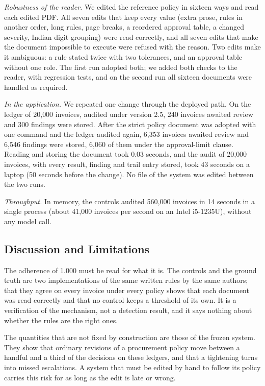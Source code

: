 \documentclass[conference]{IEEEtran}
\begin{document}
\textit{Robustness of the reader.} We edited the reference policy in sixteen ways and read each edited PDF. All seven edits that keep every value (extra prose, rules in another order, long rules, page breaks, a reordered approval table, a changed severity, Indian digit grouping) were read correctly, and all seven edits that make the document impossible to execute were refused with the reason. Two edits make it ambiguous: a rule stated twice with two tolerances, and an approval table without one role. The first run adopted both; we added both checks to the reader, with regression tests, and on the second run all sixteen documents were handled as required.

\textit{In the application.} We repeated one change through the deployed path. On the ledger of 20{,}000 invoices, audited under version 2.5, 240 invoices awaited review and 300 findings were stored. After the strict policy document was adopted with one command and the ledger audited again, 6{,}353 invoices awaited review and 6{,}546 findings were stored, 6{,}060 of them under the approval-limit clause. Reading and storing the document took 0.03 seconds, and the audit of 20{,}000 invoices, with every result, finding and trail entry stored, took 43 seconds on a laptop (50 seconds before the change). No file of the system was edited between the two runs.

\textit{Throughput.} In memory, the controls audited 560{,}000 invoices in 14 seconds in a single process (about 41{,}000 invoices per second on an Intel i5-1235U), without any model call.

\subsection{Discussion and Limitations}
The adherence of 1.000 must be read for what it is. The controls and the ground truth are two implementations of the same written rules by the same authors; that they agree on every invoice under every policy shows that each document was read correctly and that no control keeps a threshold of its own. It is a verification of the mechanism, not a detection result, and it says nothing about whether the rules are the right ones.

The quantities that are not fixed by construction are those of the frozen system. They show that ordinary revisions of a procurement policy move between a handful and a third of the decisions on these ledgers, and that a tightening turns into missed escalations. A system that must be edited by hand to follow its policy carries this risk for as long as the edit is late or wrong.
\end{document}
